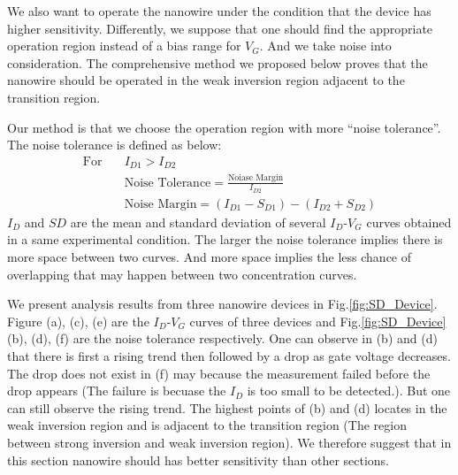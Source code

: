 We also want to operate the nanowire under the condition that the device has higher sensitivity.
Differently, we suppose that one should find the appropriate operation region instead of a bias range for $V_G$.
And we take noise into consideration.
The comprehensive method we proposed below proves that the nanowire should be operated in the weak inversion region adjacent to the transition region.

Our method is that we choose the operation region with more ``noise tolerance''.
The noise tolerance is defined as below:
\setlength{\mathindent}{2cm}
\begin{align}
    \text{For} \quad & I_{D1} > I_{D2} \\
    & \text{Noise Tolerance} = \frac{\text{Noiase Margin}}{I_{D2}} \\
    & \text{Noise Margin} = (I_{D1} - S_{D1}) - (I_{D2} + S_{D2})
\end{align}
$I_D$ and $SD$ are the mean and standard deviation of several $I_D$-$V_G$ curves obtained in a same experimental condition.
The larger the noise tolerance implies there is more space between two curves.
And more space implies the less chance of overlapping that may happen between two concentration curves.

We present analysis results from three nanowire devices in Fig.\ref{fig:SD_Device}.
Figure (a), (c), (e) are the $I_D$-$V_G$ curves of three devices and Fig.\ref{fig:SD_Device}(b), (d), (f) are the noise tolerance respectively.
One can observe in (b) and (d) that there is first a rising trend then followed by a drop as gate voltage decreases.
The drop does not exist in (f) may because the measurement failed before the drop appears (The failure is becuase the $I_D$ is too small to be detected.).
But one can still observe the rising trend.
The highest points of (b) and (d) locates in the weak inversion region and is adjacent to the transition region (The region between strong inversion and weak inversion region).
We therefore suggest that in this section nanowire should has better sensitivity than other sections.



